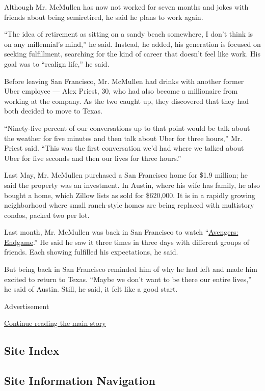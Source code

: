 Although Mr. McMullen has now not worked for seven months and jokes with
friends about being semiretired, he said he plans to work again.

``The idea of retirement as sitting on a sandy beach somewhere, I don't
think is on any millennial's mind,'' he said. Instead, he added, his
generation is focused on seeking fulfillment, searching for the kind of
career that doesn't feel like work. His goal was to ``realign life,'' he
said.

Before leaving San Francisco, Mr. McMullen had drinks with another
former Uber employee --- Alex Priest, 30, who had also become a
millionaire from working at the company. As the two caught up, they
discovered that they had both decided to move to Texas.

``Ninety-five percent of our conversations up to that point would be
talk about the weather for five minutes and then talk about Uber for
three hours,'' Mr. Priest said. ``This was the first conversation we'd
had where we talked about Uber for five seconds and then our lives for
three hours.''

Last May, Mr. McMullen purchased a San Francisco home for \$1.9 million;
he said the property was an investment. In Austin, where his wife has
family, he also bought a home, which Zillow lists as sold for \$620,000.
It is in a rapidly growing neighborhood where small ranch-style homes
are being replaced with multistory condos, packed two per lot.

Last month, Mr. McMullen was back in San Francisco to watch
``\href{https://www.nytimes.com/2019/04/23/movies/avengers-endgame-review.html}{Avengers:
Endgame}.'' He said he saw it three times in three days with different
groups of friends. Each showing fulfilled his expectations, he said.

But being back in San Francisco reminded him of why he had left and made
him excited to return to Texas. ``Maybe we don't want to be there our
entire lives,'' he said of Austin. Still, he said, it felt like a good
start.

Advertisement

\protect\hyperlink{after-bottom}{Continue reading the main story}

\hypertarget{site-index}{%
\subsection{Site Index}\label{site-index}}

\hypertarget{site-information-navigation}{%
\subsection{Site Information
Navigation}\label{site-information-navigation}}

